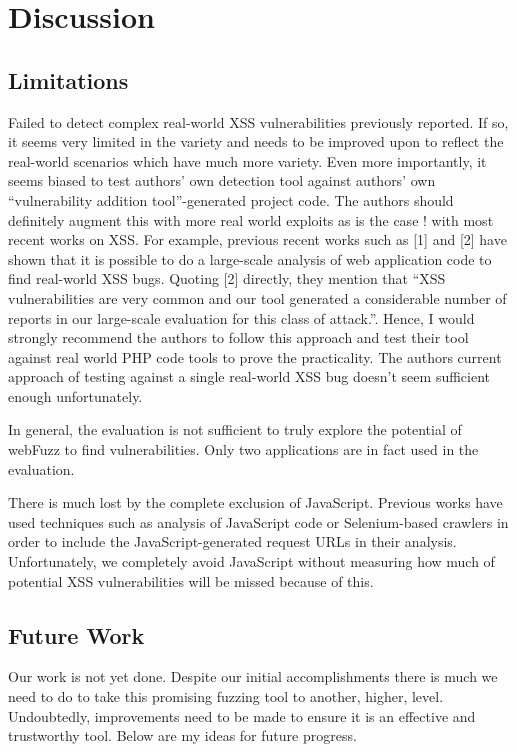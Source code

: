 \chapter{Discussion}
\label{sec:discussion}
\minitoc
\vspace*{1cm}

\section{Limitations}
Failed to detect complex real-world XSS vulnerabilities previously reported.
 If so, it seems very limited in the variety and needs to be improved upon to reflect the real-world scenarios which have much more variety. Even more importantly, it seems biased to test authors’ own detection tool against authors’ own “vulnerability addition tool”-generated project code. The authors should definitely augment this with more real world exploits as is the case !
 with most recent works on XSS. For example, previous recent works such as [1] and [2] have shown that it is possible to do a large-scale analysis of web application code to find real-world XSS bugs. Quoting [2] directly,  they mention that “XSS vulnerabilities are very common and our tool generated a considerable number of reports in our large-scale evaluation for this class of attack.”. Hence, I would strongly recommend the authors to follow this approach and test their tool against real world PHP code tools to prove the practicality.  The authors current approach of testing against a single real-world XSS bug doesn’t seem sufficient enough unfortunately.

In general, the evaluation is not sufficient to truly explore the potential of webFuzz to find vulnerabilities. Only two applications are in fact used in the evaluation.

There is much lost by the complete exclusion of JavaScript. Previous works have used techniques such as analysis of JavaScript code or Selenium-based crawlers in order to include the JavaScript-generated request URLs in their analysis. Unfortunately, we completely avoid JavaScript without measuring how much of potential XSS vulnerabilities will be missed because of this.

\section{Future Work}

Our work is not yet done. Despite our initial accomplishments there is much we need to do to take this promising fuzzing tool to another, higher, level. Undoubtedly, improvements need to be made to ensure it is an effective and trustworthy tool. Below are my ideas for future progress.

